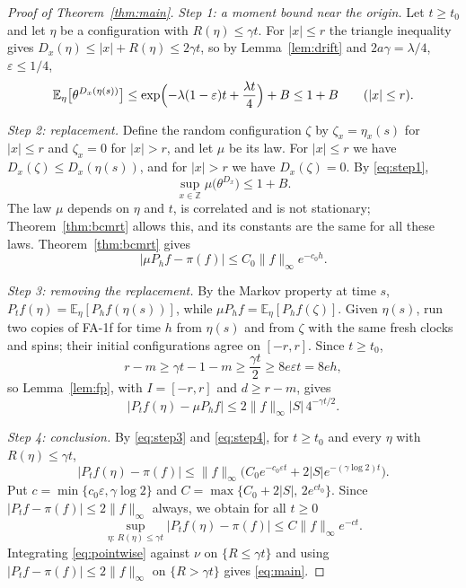 \documentclass[11pt]{amsart}
\theoremstyle{remark}
\newcommand{\E}{\mathbb{E}}
\newcommand{\Z}{\mathbb{Z}}
\begin{document}
\begin{proof}[Proof of Theorem~\ref{thm:main}]
\emph{Step 1: a moment bound near the origin.} Let $t\ge t_0$ and let $\eta$ be a configuration with
$R(\eta)\le\gamma t$. For $|x|\le r$ the triangle inequality gives $D_x(\eta)\le|x|+R(\eta)\le2\gamma t$, so by
Lemma~\ref{lem:drift} and $2a\gamma=\lambda/4$, $\varepsilon\le1/4$,
\begin{equation}\label{eq:step1}
\E_\eta\bigl[\theta^{D_x(\eta(s))}\bigr]\le\exp\Bigl(-\lambda(1-\varepsilon)t+\frac{\lambda t}{4}\Bigr)+B\le1+B
\qquad(|x|\le r).
\end{equation}

\emph{Step 2: replacement.} Define the random configuration $\zeta$ by $\zeta_x=\eta_x(s)$ for $|x|\le r$ and
$\zeta_x=0$ for $|x|>r$, and let $\mu$ be its law. For $|x|\le r$ we have $D_x(\zeta)\le D_x(\eta(s))$, and for
$|x|>r$ we have $D_x(\zeta)=0$. By \eqref{eq:step1},
\begin{equation}\label{eq:step2}
\sup_{x\in\Z}\mu\bigl(\theta^{D_x}\bigr)\le1+B.
\end{equation}
The law $\mu$ depends on $\eta$ and $t$, is correlated and is not stationary; Theorem~\ref{thm:bcmrt} allows this, and
its constants are the same for all these laws. Theorem~\ref{thm:bcmrt} gives
\begin{equation}\label{eq:step3}
|\mu P_hf-\pi(f)|\le C_0\|f\|_\infty e^{-c_0h}.
\end{equation}

\emph{Step 3: removing the replacement.} By the Markov property at time $s$, $P_tf(\eta)=\E_\eta[P_hf(\eta(s))]$,
while $\mu P_hf=\E_\eta[P_hf(\zeta)]$. Given $\eta(s)$, run two copies of FA-1f for time $h$ from $\eta(s)$ and from
$\zeta$ with the same fresh clocks and spins; their initial configurations agree on $[-r,r]$. Since $t\ge t_0$,
\[
r-m\ge\gamma t-1-m\ge\frac{\gamma t}{2}\ge8e\varepsilon t=8eh,
\]
so Lemma~\ref{lem:fp}, with $I=[-r,r]$ and $d\ge r-m$, gives
\begin{equation}\label{eq:step4}
\bigl|P_tf(\eta)-\mu P_hf\bigr|\le2\|f\|_\infty|S|\,4^{-\gamma t/2}.
\end{equation}

\emph{Step 4: conclusion.} By \eqref{eq:step3} and \eqref{eq:step4}, for $t\ge t_0$ and every $\eta$ with
$R(\eta)\le\gamma t$,
\[
|P_tf(\eta)-\pi(f)|\le\|f\|_\infty\bigl(C_0e^{-c_0\varepsilon t}+2|S|e^{-(\gamma\log2)t}\bigr).
\]
Put $c=\min\{c_0\varepsilon,\gamma\log2\}$ and $C=\max\{C_0+2|S|,\,2e^{ct_0}\}$. Since $|P_tf-\pi(f)|\le2\|f\|_\infty$
always, we obtain for all $t\ge0$
\begin{equation}\label{eq:pointwise}
\sup_{\eta:\,R(\eta)\le\gamma t}|P_tf(\eta)-\pi(f)|\le C\|f\|_\infty e^{-ct}.
\end{equation}
Integrating \eqref{eq:pointwise} against $\nu$ on $\{R\le\gamma t\}$ and using $|P_tf-\pi(f)|\le2\|f\|_\infty$ on
$\{R>\gamma t\}$ gives \eqref{eq:main}.
\end{proof}
\end{document}
